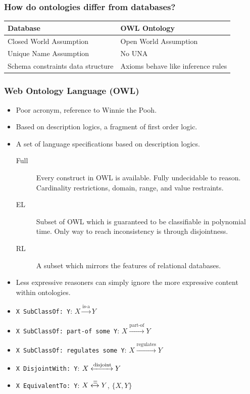 \documentclass{beamer}
\begin{document}
\begin{frame}
\frametitle{How do ontologies differ from databases?}

 \begin{table}[ht]
    \centering
    \begin{tabular}{|l|l|}
      Database & OWL Ontology \\
      \hline
      Closed World Assumption & Open World Assumption \\
      Unique Name Assumption & No UNA \\
      Schema constraints data structure %
               & Axioms behave like inference rules\\\hline
    \end{tabular}
\end{table}
\end{frame}

\begin{frame}
\frametitle{Web Ontology Language (OWL)}

\begin{itemize}
  \item Poor acronym, reference to Winnie the Pooh.
  \item Based on description logics, a fragment of first order logic.
  \item A set of language specifications based on description logics.
  \begin{description}
    \item[Full] Every construct in OWL is available. Fully undecidable to
    reason. Cardinality restrictions, domain, range, and value restraints.
    \item[EL] Subset of OWL which is guaranteed to be classifiable in polynomial
    time. Only way to reach inconsistency is through disjointness.
    \item[RL] A subset which mirrors the features of relational databases.
  \end{description}
  \item Less expressive reasoners can simply ignore the more expressive content
  within ontologies.
\end{itemize}
\end{frame}

\begin{frame}
  \begin{itemize}
  \item {\tt X SubClassOf: Y}: $X \xrightarrow{\text{is-a}} Y$
  \item {\tt X SubClassOf: part-of some Y}: $X \xrightarrow{\text{part-of}} Y$
  \item {\tt X SubClassOf: regulates some Y}: $X \xrightarrow{\text{regulates}} Y$
  \item {\tt X DisjointWith: Y}: $X \xleftrightarrow{\text{disjoint}} Y$
  \item {\tt X EquivalentTo: Y}: $X \xleftrightarrow{\equiv} Y$, $\{X,Y\}$
\end{itemize}
\end{frame}
\end{document}
